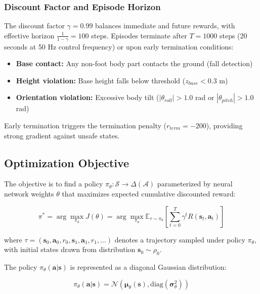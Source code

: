 \documentclass[12pt,a4paper]{article}
\begin{document}
\subsubsection{Discount Factor and Episode Horizon}

The discount factor $\gamma = 0.99$ balances immediate and future rewards, with effective horizon $\frac{1}{1-\gamma} = 100$ steps. Episodes terminate after $T = 1000$ steps (20 seconds at 50 Hz control frequency) or upon early termination conditions:

\begin{itemize}
    \item \textbf{Base contact:} Any non-foot body part contacts the ground (fall detection)
    \item \textbf{Height violation:} Base height falls below threshold ($z_{base} < 0.3$ m)
    \item \textbf{Orientation violation:} Excessive body tilt ($|\theta_{roll}| > 1.0$ rad or $|\theta_{pitch}| > 1.0$ rad)
\end{itemize}

Early termination triggers the termination penalty ($r_{term} = -200$), providing strong gradient against unsafe states.

\subsection{Optimization Objective}

The objective is to find a policy $\pi_\theta: \mathcal{S} \rightarrow \Delta(\mathcal{A})$ parameterized by neural network weights $\theta$ that maximizes expected cumulative discounted reward:

\begin{equation}
\pi^* = \arg\max_{\pi_\theta} J(\theta) = \arg\max_{\pi_\theta} \mathbb{E}_{\tau \sim \pi_\theta} \left[ \sum_{t=0}^{T} \gamma^t R(\mathbf{s}_t, \mathbf{a}_t) \right]
\label{eq:objective}
\end{equation}

where $\tau = (\mathbf{s}_0, \mathbf{a}_0, r_0, \mathbf{s}_1, \mathbf{a}_1, r_1, \ldots)$ denotes a trajectory sampled under policy $\pi_\theta$, with initial states drawn from distribution $\mathbf{s}_0 \sim \rho_0$.

The policy $\pi_\theta(\mathbf{a}|\mathbf{s})$ is represented as a diagonal Gaussian distribution:

\begin{equation}
\pi_\theta(\mathbf{a}|\mathbf{s}) = \mathcal{N}(\boldsymbol{\mu}_\theta(\mathbf{s}), \text{diag}(\boldsymbol{\sigma}_\theta^2))
\label{eq:policy_distribution}
\end{equation}
\end{document}
